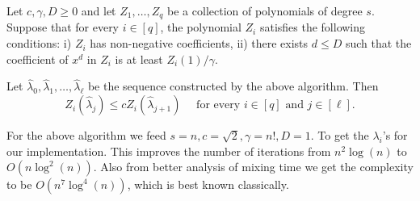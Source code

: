 \begin{flushleft}
	\begin{lemma}
		
	Let $c, \gamma, D \geq 0$ and let $Z_1, \ldots, Z_q$ be a collection of polynomials of degree $s$. Suppose that for every $i \in[q]$, the polynomial $Z_i$ satisfies the following conditions:
	i) $Z_i$ has non-negative coefficients,
	ii) there exists $d \leq D$ such that the coefficient of $x^d$ in $Z_i$ is at least $Z_i(1) / \gamma$.
	
	Let $\hat{\lambda}_0, \hat{\lambda}_1, \ldots, \hat{\lambda}_{\ell}$ be the sequence constructed by the above algorithm. Then
	$$
	Z_i\left(\hat{\lambda}_j\right) \leq c Z_i\left(\hat{\lambda}_{j+1}\right) \quad \text { for every } i \in[q] \text { and } j \in[\ell] .
	$$
\end{lemma} 
For the above algorithm we feed $s=n,c=\sqrt{2},\gamma=n!,D=1$. To get the $\lambda_i$'s for our implementation. This improves the number of iterations from $n^2\log(n)$ to $O(n\log^2(n))$.
Also from better analysis of mixing time we get the complexity  to be $O(n^7 \log^4(n))$, which is best known classically. 
\end{flushleft}